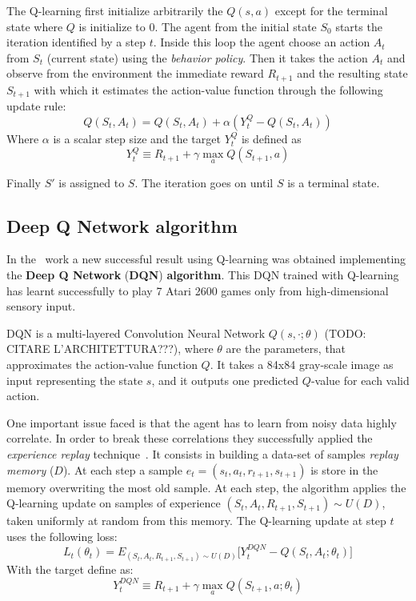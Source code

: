 The Q-learning first initialize arbitrarily the $Q(s,a)$ except for the terminal state where $Q$ is initialize to 0.
The agent from the initial state $S_0$ starts the iteration identified by a step $t$. Inside this loop the agent choose an action $A_t$ from $S_t$ (current state) using the \textit{behavior policy}. Then it takes the action $A_t$ and observe from the environment the immediate reward $R_{t+1}$ and the resulting state $S_{t+1}$ with which it estimates the action-value function through the following update rule:
\begin{equation}
	Q(S_t, A_t) = Q(S_t, A_t) + \alpha (Y^Q_t - Q(S_t, A_t))
\end{equation}
Where $\alpha$ is a scalar step size and the target $Y^Q_t$ is defined as
\begin{equation}
	Y^Q_t \equiv R_{t+1} + \gamma \max_{a} Q(S_{t+1}, a)
\end{equation}

Finally $S'$ is assigned to $S$. The iteration goes on until $S$ is a terminal state.

\subsection{Deep Q Network algorithm}
\label{subsec:DQN}

In the~\cite{DBLP:journals/corr/MnihKSGAWR13} work a new successful result using Q-learning was obtained implementing the \textbf{Deep Q Network} (\textbf{DQN}) \textbf{algorithm}. This DQN trained with Q-learning has learnt successfully to play 7 Atari 2600 games only from high-dimensional sensory input.

DQN is a multi-layered Convolution Neural Network $Q(s, \cdotp; \theta)$ (TODO: CITARE L'ARCHITETTURA???), where $\theta$ are the parameters, that approximates the action-value function $Q$. It takes a 84x84 gray-scale image as input representing the state $s$, and it outputs one predicted $Q$-value for each valid action.  

One important issue faced is that the agent has to learn from noisy data highly correlate. In order to break these correlations they successfully applied the \textit{experience replay} technique~\cite{Lin:1992:RLR:168871}. It consists in building a data-set of samples \textit{replay memory} ($D$). At each step a sample $e_t = (s_t, a_t, r_{t+1}, s_{t+1})$ is store in the memory overwriting the most old sample. At each step, the algorithm applies the Q-learning update on samples of experience $(S_t, A_t, R_{t+1}, S_{t+1}) \sim U(D)$, taken uniformly at random from this memory. The Q-learning update at step $t$ uses the following loss:
\begin{equation}
	L_t(\theta_t) = E_{(S_t, A_t, R_{t+1}, S_{t+1}) \sim U(D)} %
		\Big[ Y^{DQN}_t - Q(S_t, A_t;\theta_t) \Big]
\end{equation}
With the target define as:
\begin{equation}
Y^{DQN}_t \equiv R_{t+1} + \gamma \max_{a} Q(S_{t+1}, a; \theta_t)
\end{equation}


